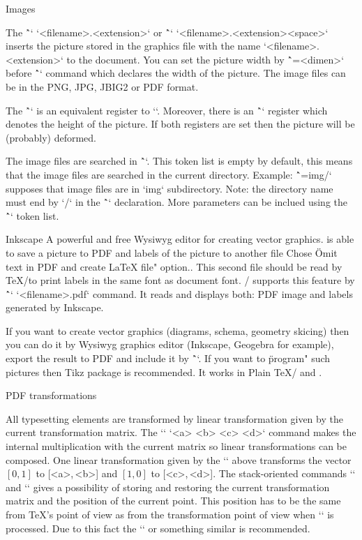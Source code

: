 {\secc Images

The \^`\inspic` `{<filename>.<extension>}` or
\^`\inspic` `<filename>.<extension><space>`
inserts the picture stored in
the graphics file with the name `<filename>.<extension>` to the document.
You can set the picture width by \^`\picw=<dimen>`
before \^`\inspic` command which declares the width of the picture.
The image files can be in the PNG, JPG, JBIG2 or PDF format.

The \^`\picwidth` is an equivalent register to `\picw`. Moreover, there is an
\^`\picheight` register which denotes the height of the picture. If both
registers are set then the picture will be (probably) deformed.

The image files are searched in \^`\picdir`. This token list is empty
by default, this means that the image files are searched in the
current directory. Example: \^`\picdir={img/}` supposes that image files are
in `img` subdirectory. Note: the directory name must end by `/` in
the \^`\picdir` declaration.
More parameters can be inclued using the \^`\picparams` token list.

Inkscape\fnote
{A powerful and free Wysiwyg editor for creating vector graphics.}
is able to save a picture to PDF and labels of the picture to another
file\fnote
{Chose \"Omit text in PDF and create LaTeX file" option.}.
This second file should be read by \TeX/to print labels
in the same font as document font. \OpTeX/ supports this feature by
\^`\inkinspic` `{<filename>.pdf}` command. It reads and displays
both: PDF image and labels generated by Inkscape.

If you want to create vector graphics (diagrams, schema, geometry
skicing) then you can do it by Wysiwyg graphics editor (Inkscape, Geogebra for
example), export the result to PDF and include it by \^`\inspic`.
If you want to \"program" such pictures then Tikz package is recommended.
It works in Plain \TeX/ and \OpTeX.

\secc PDF transformations

All typesetting elements are transformed by linear
transformation given by the current transformation matrix. The
`\pdfsetmatrix` `{<a> <b> <c> <d>}` command makes the internal multiplication
with the current matrix so linear transformations can be composed.
One linear transformation given by the `\pdfsetmatrix` above transforms
the vector $[0,1]$ to [<a>,\,<b>] and $[1,0]$ to [<c>,\,<d>].
The stack-oriented commands `\pdfsave` and `\pdfrestore` gives a possibility of
storing and restoring the current transformation matrix and the position of the current point.
This position has to be the same from \TeX{}'s point of
view as from the transformation point of view when `\pdfrestore` is processed.
Due to this fact the `\pdfsave{}\pdfrestore`
or something similar is recommended.

}
